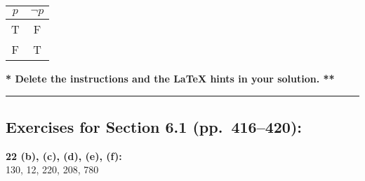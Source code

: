 \documentclass[12pt]{article}  %
\newcommand{\NOT}{\neg}
\begin{document}
\begin{center}
\begin{tabular}{|c|c|}  %
\hline                  %
$p$ & $\NOT p$ \\       %
\hline
\hline
T & F \\
\hline
F & T \\
\hline
\end{tabular}
\end{center}

{\bf ** Delete the instructions and the LaTeX hints in your solution. **}

\rule{6in}{.1pt}       %



\subsection*{Exercises for Section 6.1 (pp.\ 416--420):}     

\noindent
{\bf 22 (b), (c), (d), (e), (f):} 
\\
130, 12, 220, 208, 780
\end{document}
